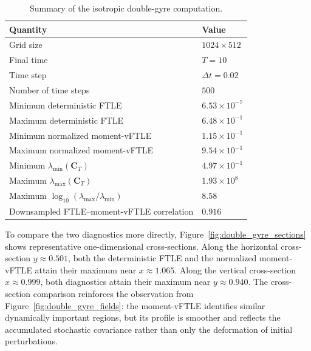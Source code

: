 \documentclass[a4paper,11pt]{article}
\numberwithin{equation}{section}
\theoremstyle{plain}
\theoremstyle{definition}
\theoremstyle{remark}
\newcommand{\bC}{\mathbf{C}}
\begin{document}
\begin{table}[t]
    \centering
    \caption{Summary of the isotropic double-gyre computation.}
    \label{tab:double_gyre_summary}
    \begin{tabular}{ll}
        \hline
        Quantity & Value \\
        \hline
        Grid size & \(1024\times512\) \\
        Final time & \(T=10\) \\
        Time step & \(\Delta t=0.02\) \\
        Number of time steps & \(500\) \\
        Minimum deterministic FTLE & \(6.53\times10^{-7}\) \\
        Maximum deterministic FTLE & \(6.48\times10^{-1}\) \\
        Minimum normalized moment-vFTLE & \(1.15\times10^{-1}\) \\
        Maximum normalized moment-vFTLE & \(9.54\times10^{-1}\) \\
        Minimum \(\lambda_{\min}(\bC_T)\) & \(4.97\times10^{-1}\) \\
        Maximum \(\lambda_{\max}(\bC_T)\) & \(1.93\times10^{8}\) \\
        Maximum \(\log_{10}(\lambda_{\max}/\lambda_{\min})\) & \(8.58\) \\
        Downsampled FTLE--moment-vFTLE correlation & \(0.916\) \\
        \hline
    \end{tabular}
\end{table}

To compare the two diagnostics more directly, Figure~\ref{fig:double_gyre_sections} shows representative one-dimensional cross-sections.  Along the horizontal cross-section \(y\approx0.501\), both the deterministic FTLE and the normalized moment-vFTLE attain their maximum near \(x\approx1.065\).  Along the vertical cross-section \(x\approx0.999\), both diagnostics attain their maximum near \(y\approx0.940\).  The cross-section comparison reinforces the observation from Figure~\ref{fig:double_gyre_fields}: the moment-vFTLE identifies similar dynamically important regions, but its profile is smoother and reflects the accumulated stochastic covariance rather than only the deformation of initial perturbations.
\end{document}
